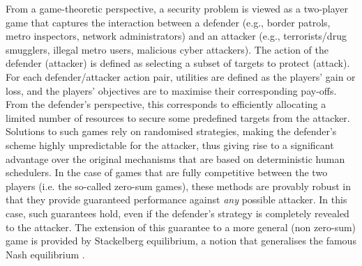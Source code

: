 \documentclass[a4paper,11pt]{article}
\renewcommand{\cite}{\autocite} %
\begin{document}
From a game-theoretic perspective, a security problem is viewed as a two-player game that captures the interaction between a defender (e.g., border patrols, metro inspectors, network administrators) and an attacker (e.g., terrorists/drug smugglers, illegal metro users, malicious cyber attackers). The action of the defender (attacker) is defined as selecting a subset of targets to protect (attack). For each defender/attacker action pair, utilities are defined as the players' gain or loss, and the players' objectives are to maximise their corresponding pay-offs. From the defender's perspective, this corresponds to efficiently allocating a limited number of resources to secure some predefined targets from the attacker. 
Solutions to such games rely on randomised strategies, making the defender's scheme highly unpredictable for the attacker, thus giving rise to a significant advantage over the original mechanisms that are based on deterministic human schedulers. In the case of games that are fully competitive between the two players  (i.e. the so-called zero-sum games), these methods are provably robust in that they provide guaranteed performance against {\em any} possible attacker. In this case, such guarantees hold, even if the defender's strategy is completely revealed to the attacker.  
The extension of this guarantee to a more general (non zero-sum) game is provided by Stackelberg equilibrium, a notion that generalises the famous Nash equilibrium \cite{korzhyk2011stackelberg}. 
\end{document}
